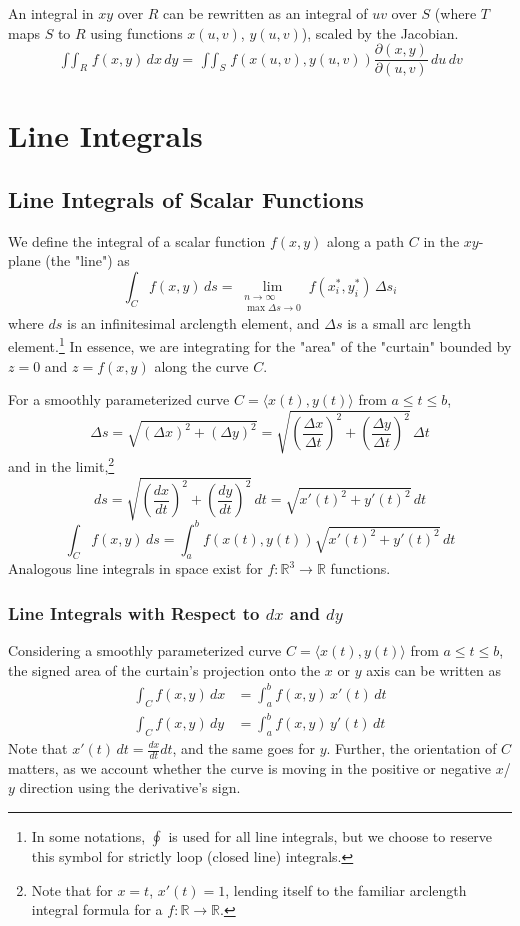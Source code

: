 \documentclass{article}
\begin{document}
An integral in $xy$ over $R$ can be rewritten as an integral of $uv$ over $S$ (where $T$ maps $S$ to $R$ using functions $x(u,v)$, $y(u,v)$), scaled by the Jacobian.
$$\mathop{\int\int}_Rf(x,y)\,dx\,dy=\mathop{\int\int}_Sf(x(u,v), y(u,v))\frac{\partial(x,y)}{\partial(u,v)}\,du\,dv$$

\section{Line Integrals}
\subsection{Line Integrals of Scalar Functions}
We define the integral of a scalar function $f(x,y)$ along a path $C$ in the $xy$-plane (the "line") as
$$\int_C f(x,y)\,ds = \lim_{\substack{n\to\infty\\\max \Delta{s}\to0}}f(x_i^*,y_i^*)\,\Delta{s}_i$$
where $ds$ is an infinitesimal arclength element, and $\Delta{s}$ is a small arc length element.\footnote{In some notations, $\oint$ is used for all line integrals, but we choose to reserve this symbol for strictly loop (closed line) integrals.} In essence, we are integrating for the "area" of the "curtain" bounded by $z=0$ and $z=f(x,y)$ along the curve $C$.

For a smoothly parameterized curve $C=\langle x(t),y(t)\rangle$ from $a\le t \le b$,
\[
    \Delta{s}=\sqrt{(\Delta{x})^2+(\Delta y)^2} = \sqrt{\left(\frac{\Delta{x}}{\Delta t}\right)^2+\left(\frac{\Delta{y}}{\Delta t}\right)^2}\,\Delta t
\]
and in the limit,\footnote{Note that for $x=t$, $x'(t) = 1$, lending itself to the familiar arclength integral formula for a $f:\mathbb{R}\to\mathbb{R}$.} \[ds = \sqrt{\left(\frac{dx}{dt}\right)^2+\left(\frac{dy}{dt}\right)^2}\,dt = \sqrt{x'(t)^2 + y'(t)^2}\,dt\]
$$\int_Cf(x,y)\,ds=\int_a^bf(x(t),y(t))\sqrt{x'(t)^2 + y'(t)^2}\,dt$$
Analogous line integrals in space exist for $f: \mathbb{R}^3\to\mathbb{R}$ functions.

\subsubsection{Line Integrals with Respect to \texorpdfstring{$dx$ and $dy$}{dx and dy}}
Considering a smoothly parameterized curve $C=\langle x(t),y(t)\rangle$ from $a\le t \le b$, the signed area of the curtain's projection onto the $x$ or $y$ axis can be written as
\begin{align*}
    \int_Cf(x,y)\,dx&=\int_a^bf(x,y)\,x'(t)\,dt\\
    \int_Cf(x,y)\,dy&=\int_a^bf(x,y)\,y'(t)\,dt
\end{align*}
Note that $x'(t)\,dt=\frac{dx}{dt}dt$, and the same goes for $y$. Further, the orientation of $C$ matters, as we account whether the curve is moving in the positive or negative $x$/$y$ direction using the derivative's sign.
\end{document}
